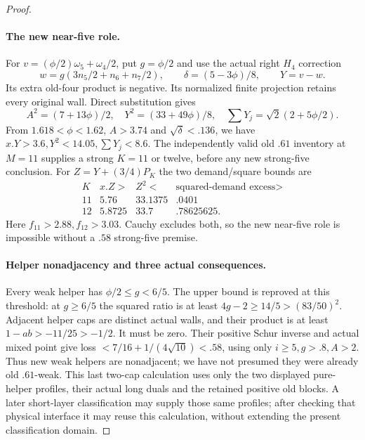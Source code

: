 \begin{proof}
\paragraph{The new near-five role.}
For $v=(\phi/2)\omega_5+\omega_4/2$, put $g=\phi/2$ and use
the actual right $H_4$ correction
\[
 w=g(3n_5/2+n_6+n_7/2),\qquad
 \delta=(5-3\phi)/8,\qquad Y=v-w.
\]
Its extra old-four product is negative. Its normalized finite
projection retains every original wall. Direct substitution gives
\[
 A^2=(7+13\phi)/2,\quad Y^2=(33+49\phi)/8,\quad
 \sum Y_j=\sqrt2(2+5\phi/2).
\]
From $1.618<\phi<1.62$, $A>3.74$ and $\sqrt\delta<.136$,
we have $x.Y>3.6,Y^2<14.05,\sum Y_j<8.6$.
The independently valid old $.61$ inventory at $M=11$ supplies
a strong $K=11$ or twelve, before any new strong-five conclusion.
For $Z=Y+(3/4)P_K$ the two demand/square bounds are
\[
\begin{array}{c|c|c|c}
K&x.Z>&Z^2<&\text{squared-demand excess}>\\\hline
11&5.76&33.1375&.0401\\12&5.8725&33.7&.78625625 .
\end{array}
\]
Here $f_{11}>2.88,f_{12}>3.03$. Cauchy excludes both, so the
new near-five role is impossible without a $.58$ strong-five premise.

\paragraph{Helper nonadjacency and three actual consequences.}
Every weak helper has $\phi/2\le g<6/5$. The upper bound is
reproved at this threshold: at $g\ge6/5$ the squared ratio is at
least $4g-2\ge14/5>(83/50)^2$. Adjacent helper caps are distinct
actual walls, and their product is at least
$1-ab>-11/25>-1/2$. It must be zero. Their positive Schur inverse
and actual mixed point give loss
$<7/16+1/(4\sqrt{10})<.58$, using only $i\ge5,g>.8,A>2$.
Thus new weak helpers are nonadjacent; we have not presumed they
were already old $.61$-weak.
This last two-cap calculation uses only the two displayed pure-helper
profiles, their actual long duals and the retained positive old blocks.
A later short-layer classification may supply those same profiles;
after checking that physical interface it may reuse this calculation,
without extending the present classification domain.


\end{proof}
